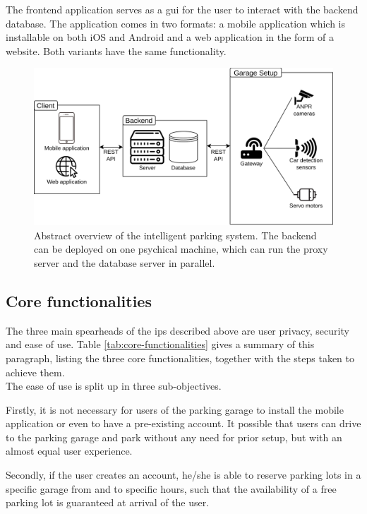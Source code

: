 The frontend application serves as a \ac{gui} for the user to interact with the backend database. The application comes in two formats: a mobile application which is installable on both iOS and Android and a web application in the form of a website. Both variants have the same functionality.

\begin{figure}[htp]
    \centering
    \includegraphics[width=12cm]{images/abstract_diagram.drawio.png}
    \caption[Abstract overview of the intelligent parking system.]{Abstract overview of the intelligent parking system. The backend can be deployed on one psychical machine, which can run the proxy server and the database server in parallel.}
    \label{fig:my_label}
\end{figure}


\subsection{Core functionalities}\label{sec:core-functionalities}
The three main spearheads of the \ac{ips} described above are user privacy, security and ease of use. Table \ref{tab:core-functionalities} gives a summary of this paragraph, listing the three core functionalities, together with the steps taken to achieve them.\\ 

The ease of use is split up in three sub-objectives.

\ind Firstly, it is not necessary for users of the parking garage to install the mobile application or even to have a pre-existing account. It possible that users can drive to the parking garage and park without any need for prior setup, but with an almost equal user experience.

\ind Secondly, if the user creates an account, he/she is able to reserve parking lots in a specific garage from and to specific hours, such that the availability of a free parking lot is guaranteed at arrival of the user.

